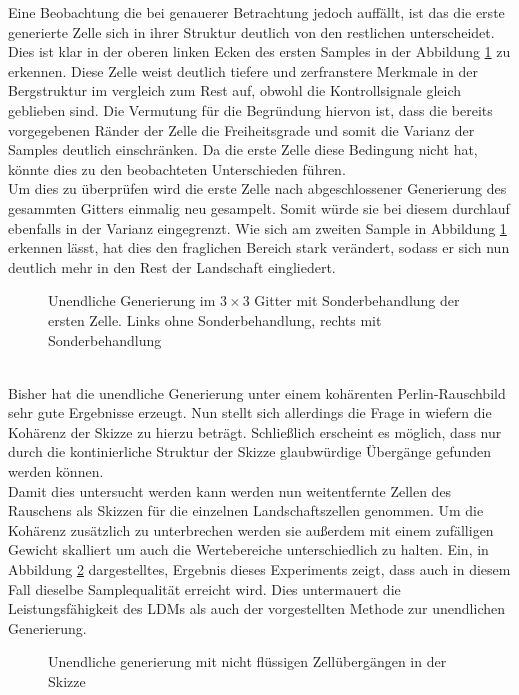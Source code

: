 Eine Beobachtung die bei genauerer Betrachtung jedoch auffällt, ist das die erste generierte Zelle sich in ihrer Struktur deutlich von den restlichen unterscheidet. Dies ist klar in der oberen linken Ecken des ersten Samples in der Abbildung \ref{fig:1st_regen} zu erkennen. Diese Zelle weist deutlich tiefere und zerfranstere Merkmale in der Bergstruktur im vergleich zum Rest auf, obwohl die Kontrollsignale gleich geblieben sind. Die Vermutung für die Begründung hiervon ist, dass die bereits vorgegebenen Ränder der Zelle die Freiheitsgrade und somit die Varianz der Samples deutlich einschränken. Da die erste Zelle diese Bedingung nicht hat, könnte dies zu den beobachteten Unterschieden führen. \\ 
Um dies zu überprüfen wird die erste Zelle nach abgeschlossener Generierung des gesammten Gitters einmalig neu gesampelt. Somit würde sie bei diesem durchlauf ebenfalls in der Varianz eingegrenzt. Wie sich am zweiten Sample in Abbildung \ref{fig:1st_regen} erkennen lässt, hat dies den fraglichen Bereich stark verändert, sodass er sich nun deutlich mehr in den Rest der Landschaft eingliedert. 
\begin{figure}[htbp]
    \centering
    \caption{Unendliche Generierung im $3\times3$ Gitter mit Sonderbehandlung der ersten Zelle. Links ohne Sonderbehandlung, rechts mit Sonderbehandlung}
    \label{fig:1st_regen}
\end{figure} \\
Bisher hat die unendliche Generierung unter einem kohärenten Perlin-Rauschbild sehr gute Ergebnisse erzeugt. Nun stellt sich allerdings die Frage in wiefern die Kohärenz der Skizze zu hierzu beträgt. Schließlich erscheint es möglich, dass nur durch die kontinierliche Struktur der Skizze glaubwürdige Übergänge gefunden werden können. \\
Damit dies untersucht werden kann werden nun weitentfernte Zellen des Rauschens als Skizzen für die einzelnen Landschaftszellen genommen. Um die Kohärenz zusätzlich zu unterbrechen werden sie außerdem mit einem zufälligen Gewicht skalliert um auch die Wertebereiche unterschiedlich zu halten. Ein, in Abbildung \ref{fig:disconnected} dargestelltes, Ergebnis dieses Experiments zeigt, dass auch in diesem Fall dieselbe Samplequalität erreicht wird. Dies untermauert die Leistungsfähigkeit des LDMs als auch der vorgestellten Methode zur unendlichen Generierung.  
\begin{figure}[htbp]
    \centering
    \caption{Unendliche generierung mit nicht flüssigen Zellübergängen in der Skizze}
    \label{fig:disconnected}
\end{figure}

